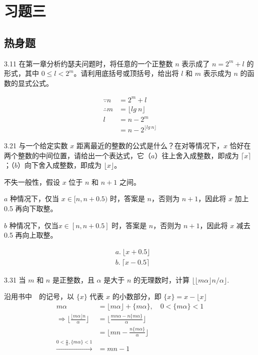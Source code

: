 \section{习题三}

\subsection{热身题}

\begin{problem}{3.1}{1}
  在第一章分析约瑟夫问题时，将任意的一个正整数 \( n \) 表示成了 \( n=2^m+l \) 的形式，其中 \( 0 \le l < 2^m \)。请利用底括号或顶括号，给出将 \( l \) 和 \( m \) 表示成为 \( n \) 的函数的显式公式。
\end{problem}

\begin{align*}
  \because n &= 2^m + l \\
  \therefore m &= \lfloor lg \ n \rfloor \\
  l &= n - 2^m \\
  &= n - 2^{\lfloor lg \ n \rfloor}
\end{align*}

\begin{problem}{3.2}{1}
  与一个给定实数 \( x \) 距离最近的整数的公式是什么？在对等情况下，\( x \) 恰好在两个整数的中间位置，请给出一个表达式，它（\( a \)）往上舍入成整数，即成为 \( \lceil x \rceil \)；（\( b \)）向下舍入成整数，即成为 \( \lfloor x \rfloor \)。
\end{problem}

不失一般性，假设 \( x \) 位于 \( n \) 和 \( n+1 \) 之间。

\( a \) 种情况下，仅当 \( x \in [n, n+0.5) \) 时，答案是 \( n \)，否则为 \( n+1 \)，因此将 \( x \) 加上 0.5 再向下取整。

\( b \) 种情况下，仅当\( x \in [n, n+0.5] \) 时，答案是 \( n \)，否则为 \( n+1 \)，因此将 \( x \) 减去 0.5 再向上取整。

\begin{align*}
  & a. \ \lfloor x + 0.5 \rfloor \\
  & b. \ \lceil x - 0.5 \rceil
\end{align*}

\begin{problem}{3.3}{1}
  当 \( m \) 和 \( n \) 是正整数，且 \( \alpha \) 是大于 \( n \) 的无理数时，计算 \( \lfloor \lfloor m \alpha \rfloor n / \alpha \rfloor \).
\end{problem}

沿用书中~\cite{graham1994concrete}~的记号，以 \( \{ x \} \) 代表 \( x \) 的小数部分，即 \( \{ x \} = x - \lfloor x \rfloor \)
\begin{align*}
  m \alpha & = \lfloor m \alpha \rfloor + \{ m \alpha \}, \quad 0 < \{ m \alpha \} < 1\\
  \Rightarrow
  \lfloor \frac{\lfloor m \alpha \rfloor n}{\alpha} \rfloor & = \lfloor \frac{mn \alpha - n \{m \alpha \}}{\alpha} \rfloor \\
  & = \lfloor mn - \frac{n \{m \alpha\}}{\alpha} \rfloor \\
  \xrightarrow{0< \frac{n}{\alpha}, \{ m \alpha \} < 1}
  & = mn - 1
\end{align*}

